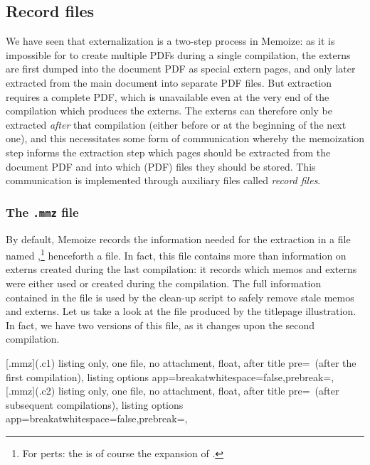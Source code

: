 \documentclass[a4paper,11pt]{article}
\begin{document}
\subsection{Record files}
\label{sec:record-files}

We have seen that externalization is a two-step process in Memoize: as it is
impossible for  to create multiple PDFs during a single
compilation, the externs are first dumped into the document PDF as special
extern pages, and only later extracted from the main document into separate PDF
files.  But extraction requires a complete PDF, which is unavailable even at
the very end of the compilation which produces the externs.  The externs can
therefore only be extracted \emph{after} that compilation (either before or at
the beginning of the next one), and this necessitates some form of
communication whereby the memoization step informs the extraction step which
pages should be extracted from the document PDF and into which (PDF) files they
should be stored.  This communication is implemented through auxiliary files
called \emph{record files}.

\subsubsection{The \texttt{.mmz} file}
\label{sec:.mmz}

By default, Memoize records the information needed for the extraction in a file
named \dmmz,\footnote{For perts: the
   is of course the expansion of .} henceforth
a \dmmz file.  In fact, this file contains more than information on externs
created during the last compilation: it records which memos and externs were
either used or created during the compilation.  The full information contained
in the \dmmz file is used by the clean-up script 
to safely remove stale memos and externs.  Let us take a look at the \dmmz file
produced by the titlepage illustration.  In fact, we have two versions of this
file, as it changes upon the second compilation.

[.mmz](.c1){
  listing only, one file, no attachment, float,
  after title pre={\ (after the first compilation)},
  listing options app={breakatwhitespace=false,prebreak=},
}
[.mmz](.c2){
  listing only, one file, no attachment, float,
  after title pre={\ (after subsequent compilations)},
  listing options app={breakatwhitespace=false,prebreak=},
}
\end{document}
